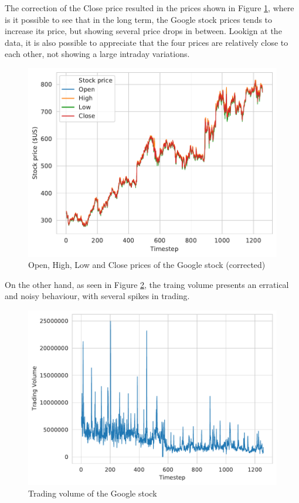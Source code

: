 \documentclass[10pt,twocolumn,letterpaper]{article}
\begin{document}
The correction of the Close price resulted in the prices shown in Figure \ref{fig:price_corrected}, where is it possible to see that in the long term, the Google stock prices tends to increase its price, but showing several price drops in between. Lookign at the data, it is also possible to appreciate that the four prices are relatively close to each other, not showing a large intraday variations. 

\begin{figure}[h]
	\begin{center}
		\includegraphics[width=1.0\linewidth]{stock_price_corrected.pdf}
	\end{center}
	\caption{Open, High, Low and Close prices of the Google stock (corrected)}
	\label{fig:price_corrected}
\end{figure}

On the other hand, as seen in Figure \ref{fig:volume}, the traing volume presents an erratical and noisy behaviour, with several spikes in trading.

\begin{figure}[h]
	\begin{center}
		\includegraphics[width=1.0\linewidth]{volume.pdf}
	\end{center}
	\caption{Trading volume of the Google stock}
	\label{fig:volume}
\end{figure}
\end{document}
